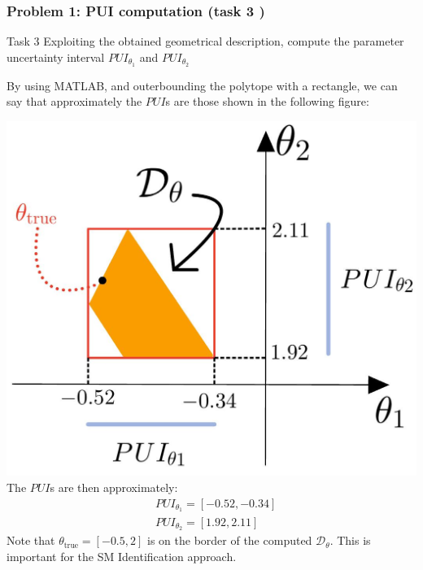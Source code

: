 \documentclass{beamer}
\begin{document}
\begin{frame}
    \frametitle{Problem 1: PUI computation (task 3 )}
    \begin{alertblock}{Task 3}
        \justifying
        Exploiting the obtained geometrical description, compute the parameter uncertainty interval $PUI_{\theta_1}$ and $PUI_{\theta_2}$
    \end{alertblock}
    By using \textsc{MATLAB}, and outerbounding the polytope with a {\color{red}rectangle}, we can say that approximately the $PUI$s are those shown in the following figure:
    \begin{multicols}{2}
        \includegraphics[scale=0.13]{img/pui.jpeg}\\
        \newcolumn
        The $PUI$s are then approximately: 
        \begin{align}
            &PUI_{\theta_1}=[-0.52,-0.34]\\
            &PUI_{\theta_2}=[1.92, 2.11]
        \end{align}
        Note that \alert{$\theta_{\text{true}}=[-0.5,2]$} is on the border of the computed $\mathcal{D}_\theta$. This is important for the SM Identification approach.
    \end{multicols}
\end{frame}
\end{document}

